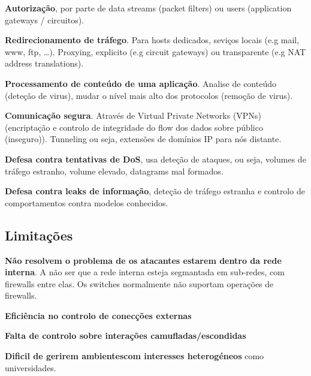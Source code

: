 \documentclass{article}
\begin{document}
\begin{flushleft}
  \textbf{Autorização}, por parte de data streams (packet filters) ou
  users (application gateways / circuitos).

  \vspace{2mm}

  \textbf{Redirecionamento de tráfego}. Para hosts dedicados, seviços locais
  (e.g mail, www, ftp, \dots). Proxying, explicito (e.g circuit gateways) ou
  transparente (e.g NAT address translations).

  \vspace{2mm}

  \textbf{Processamento de conteúdo de uma aplicação}. Analise de conteúdo (deteção de
  virus), mudar o nível mais alto dos protocolos (remoção de virus).

  \vspace{2mm}

  \textbf{Comunicação segura}. Através de Virtual Private Networks (VPNs) (encriptação
  e controlo de integridade do flow dos dados sobre público (inseguro)). Tunneling ou seja,
  extensões de domínios IP para nós distante.
  
  \vspace{2mm}

  \textbf{Defesa contra tentativas de DoS}, usa deteção de ataques,
  ou seja, volumes de tráfego estranho, volume elevado, datagrams mal formados.

  \vspace{2mm}

  \textbf{Defesa contra leaks de informação}, deteção de tráfego estranha e
  controlo de comportamentos contra modelos conhecidos.
\end{flushleft}

\pagebreak

\subsection{Limitações}

\begin{flushleft}
  \begin{flushleft}
    \textbf{Não resolvem o problema de os atacantes estarem dentro da rede interna}. A não ser
    que a rede interna esteja segmantada em sub-redes, com firewalls entre elas.
    Os switches normalmente não suportam operações de firewalls.

    \vspace{2mm}

    \textbf{Eficiência no controlo de conecções externas}

    \vspace{2mm}

    \textbf{Falta de controlo sobre interações camufladas/escondidas}

    \vspace{2mm}

    \textbf{Dificil de gerirem ambientescom interesses heterogéneos} como
    universidades.
  \end{flushleft}
\end{flushleft}
\end{document}
